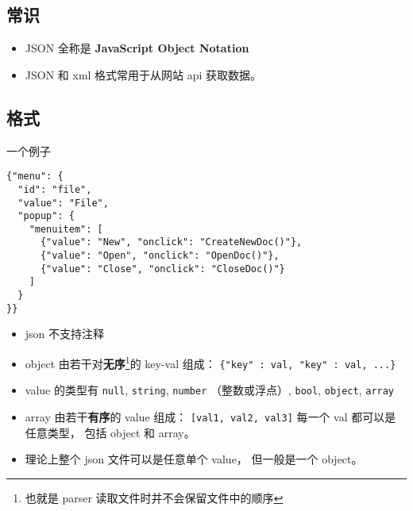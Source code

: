 
\begin{issues}
\issueDraft
\end{issues}

\subsection{常识}
\begin{itemize}
\item JSON 全称是 \textbf{JavaScript Object Notation}
\item JSON 和 xml 格式常用于从网站 api 获取数据。
\end{itemize}

\subsection{格式}
一个例子
\begin{lstlisting}[language=none]
{"menu": {
  "id": "file",
  "value": "File",
  "popup": {
    "menuitem": [
      {"value": "New", "onclick": "CreateNewDoc()"},
      {"value": "Open", "onclick": "OpenDoc()"},
      {"value": "Close", "onclick": "CloseDoc()"}
    ]
  }
}}
\end{lstlisting}

\begin{itemize}
\item json 不支持注释
\item object 由若干对\textbf{无序}\footnote{也就是 parser 读取文件时并不会保留文件中的顺序}的 key-val 组成： \verb`{"key" : val, "key" : val, ...}`
\item value 的类型有 \verb`null`, \verb`string`, \verb`number` （整数或浮点）, \verb`bool`, \verb`object`, \verb`array`
\item array 由若干\textbf{有序}的 value 组成： \verb`[val1, val2, val3]` 每一个 val 都可以是任意类型， 包括 object 和 array。
\item 理论上整个 json 文件可以是任意单个 value， 但一般是一个 object。
\end{itemize}

